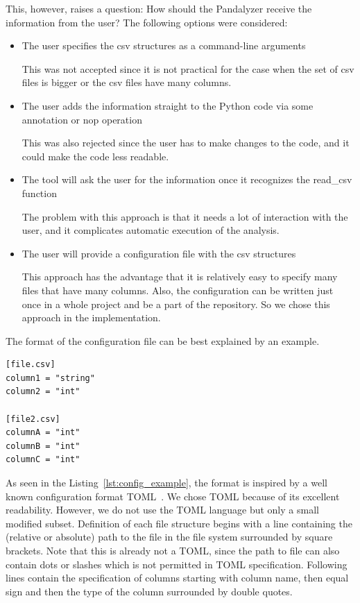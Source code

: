 This, however, raises a question: How should the Pandalyzer receive the information from the user?
The following options were considered:
\begin{itemize}
    \item The user specifies the csv structures as a command-line arguments

    This was not accepted since it is not practical for the case when the set of csv files is bigger or the csv files
    have many columns.

    \item The user adds the information straight to the Python code via some annotation or nop operation

    This was also rejected since the user has to make changes to the code, and it could make the code less readable.

    \item The tool will ask the user for the information once it recognizes the read\_csv function

    The problem with this approach is that it needs a lot of interaction with the user, and it complicates automatic
    execution of the analysis.

    \item The user will provide a configuration file with the csv structures

    This approach has the advantage that it is relatively easy to specify many files that have many columns.
    Also, the configuration can be written just once in a whole project and be a part of the repository.
    So we chose this approach in the implementation.
\end{itemize}

The format of the configuration file can be best explained by an example.

\begin{lstlisting}[caption=An example configuration file, label={lst:config_example}, captionpos=b]
[file.csv]
column1 = "string"
column2 = "int"

[file2.csv]
columnA = "int"
columnB = "int"
columnC = "int"
\end{lstlisting}

As seen in the Listing~\ref{lst:config_example}, the format is inspired by a well known configuration format
TOML~\cite{toml_spec}.
We chose TOML because of its excellent readability.
However, we do not use the TOML language but only a small modified subset.
Definition of each file structure begins with a line containing the (relative or absolute) path to the file in the file
system surrounded by square brackets.
Note that this is already not a TOML, since the path to file can also contain dots or slashes which is not permitted in
TOML specification.
Following lines contain the specification of columns starting with column name, then equal sign and then the type of the
column surrounded by double quotes.

